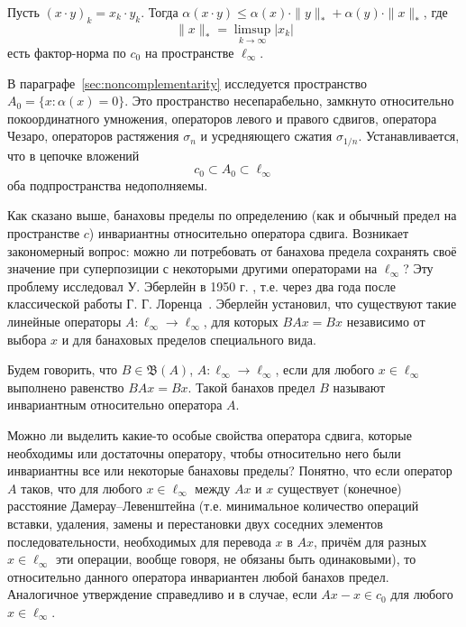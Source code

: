 	Пусть $(x\cdot y)_k = x_k\cdot y_k$.
	Тогда
	$\alpha(x\cdot y)\leq \alpha(x)\cdot \|y\|_* + \alpha(y)\cdot \|x\|_*$,
	где
	\begin{equation}
		\|x\|_* = \limsup_{k\to\infty} |x_k|
	\end{equation}
	есть  фактор-норма по $c_0$ на пространстве $\ell_\infty$.

В параграфе~\ref{sec:noncomplementarity} исследуется пространство $A_0 = \{x: \alpha(x) = 0\}$.
Это пространство несепарабельно, замкнуто относительно покоординатного умножения,
операторов левого и правого сдвигов, оператора Чезаро,
операторов растяжения $\sigma_n$ и усредняющего сжатия $\sigma_{1/n}$.
Устанавливается, что в цепочке вложений
\begin{equation}
	c_0 \subset A_0 \subset \ell_\infty
\end{equation}
оба подпространства недополняемы.

Как сказано выше, банаховы пределы по определению (как и обычный предел на пространстве $c$) инвариантны относительно оператора сдвига.
Возникает закономерный вопрос: можно ли потребовать от банахова предела сохранять своё значение
при суперпозиции с некоторыми другими операторами на $\ell_\infty$?
Эту проблему исследовал У. Эберлейн в 1950 г. \cite{Eberlein},
т.е. через два года после классической работы Г. Г. Лоренца~\cite{lorentz1948contribution}.
Эберлейн установил, что существуют такие линейные операторы  $A : \ell_\infty\to \ell_\infty$,
для которых $BAx = Bx$ независимо от выбора $x$ и для банаховых пределов специального вида.

Будем говорить, что $B\in\mathfrak B(A)$, $A : \ell_\infty\to \ell_\infty$, если для любого $x\in \ell_\infty$
выполнено равенство $BAx = Bx$.
Такой банахов предел $B$ называют инвариантным относительно оператора $A$.

Можно ли выделить какие-то особые свойства оператора сдвига,
которые необходимы или достаточны оператору, чтобы относительно него были инвариантны все или некоторые банаховы пределы?
Понятно, что если оператор $A$ таков, что для любого $x\in\ell_\infty$ между $Ax$ и $x$
существует (конечное) расстояние Дамерау--Левенштейна \cite{damerau1964technique} (т.е. минимальное количество операций вставки, удаления, замены и перестановки двух соседних элементов последовательности, необходимых для перевода $x$ в $Ax$, причём для разных $x\in\ell_\infty$ эти операции, вообще говоря, не обязаны быть одинаковыми), то относительно данного оператора инвариантен любой банахов предел. Аналогичное утверждение справедливо и в случае, если $Ax -x \in c_0$ для любого $x\in \ell_\infty$.

